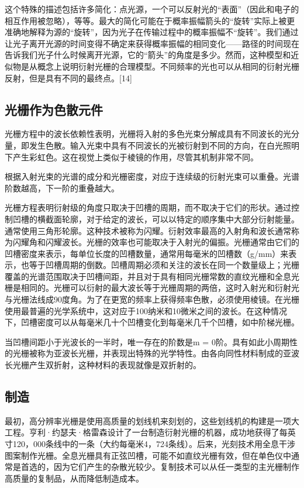 这个特殊的描述包括许多简化：点光源，一个可以反射光的“表面”（因此和电子的相互作用被忽略），等等。最大的简化可能在于概率振幅箭头的“旋转”实际上被更准确地解释为源的“旋转”，因为光子在传输过程中的概率振幅不“旋转”。我们通过让光子离开光源的时间变得不确定来获得概率振幅的相同变化——路径的时间现在告诉我们光子什么时候离开光源，它的“箭头”的角度是多少。然而，这种模型和近似物是从概念上说明衍射光栅的合理模型。不同频率的光也可以从相同的衍射光栅反射，但是具有不同的最终点。[14]

\subsection{光栅作为色散元件}
光栅方程中的波长依赖性表明，光栅将入射的多色光束分解成具有不同波长的光分量，即发生色散。输入光束中具有不同波长的光被衍射到不同的方向，在白光照明下产生彩虹色。这在视觉上类似于棱镜的作用，尽管其机制非常不同。

根据入射光束的光谱的成分和光栅密度，对应于连续级的衍射光束可以重叠。光谱阶数越高，下一阶的重叠越大。

光栅方程表明衍射级的角度只取决于凹槽的周期，而不取决于它们的形状。通过控制凹槽的横截面轮廓，对于给定的波长，可以以特定的顺序集中大部分衍射能量。通常使用三角形轮廓。这种技术被称为闪耀。衍射效率最高的入射角和波长通常称为闪耀角和闪耀波长。光栅的效率也可能取决于入射光的偏振。光栅通常由它们的凹槽密度来表示，每单位长度的凹槽数量，通常用每毫米的凹槽数（g/mm）来表示，也等于凹槽周期的倒数。凹槽周期必须和关注的波长在同一个数量级上；光栅覆盖的光谱范围取决于凹槽间距，并且对于具有相同光栅常数的直纹光栅和全息光栅是相同的。光栅可以衍射的最大波长等于光栅周期的两倍，这时入射光和衍射光与光栅法线成90度角。为了在更宽的频率上获得频率色散，必须使用棱镜。在光栅使用最普遍的光学系统中，这对应于100纳米和10微米之间的波长。在这种情况下，凹槽密度可以从每毫米几十个凹槽变化到每毫米几千个凹槽，如中阶梯光栅。

当凹槽间距小于光波长的一半时，唯一存在的阶数是m = 0阶。具有如此小周期性的光栅被称为亚波长光栅，并表现出特殊的光学特性。由各向同性材料制成的亚波长光栅产生双折射，这种材料的表现就像是双折射的。

\subsection{制造}
最初，高分辨率光栅是使用高质量的划线机来刻划的，这些划线机的构建是一项大工程。亨利·约瑟夫·格雷森设计了一台制造衍射光栅的机器，成功地获得了每英寸120，000条线中的一条（大约每毫米4，724条线）。后来，光刻技术用全息干涉图案制作光栅。全息光栅具有正弦凹槽，可能不如直纹光栅有效，但在单色仪中通常是首选的，因为它们产生的杂散光较少。复制技术可以从任一类型的主光栅制作高质量的复制品，从而降低制造成本。

